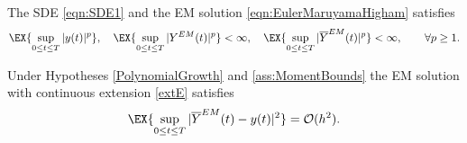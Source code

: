 \begin{hypothesis}\label{ass:MomentBounds}
	The SDE \eqref{eqn:SDE1} and the EM solution \eqref{eqn:EulerMaruyamaHigham} satisfies
	\begin{equation*}
		\EX{
			\sup_{0\leq t\leq T}
			|y(t)|^p	
		}, \quad
	\EX{
		\sup_{0\leq t\leq T}
			|Y^{EM}(t)|^p	
	}< \infty, \quad
	\EX{
		\sup_{0\leq t\leq T}
		|\overline{Y}^{EM}(t)|^p	
	} < \infty, \qquad \forall p\geq 1.
	\end{equation*}
\end{hypothesis}
\begin{thm}
	Under Hypotheses  \ref{PolynomialGrowth} and \ref{ass:MomentBounds} the EM solution with 
	continuous extension \eqref{extE}
	satisfies
	\begin{equation}
		\EX{
			\sup_{0\leq t \leq T}
			|\overline{Y}^{EM}(t) - y(t)|^2
		} = \mathcal{O}(h^2).
	\end{equation}
\end{thm}


